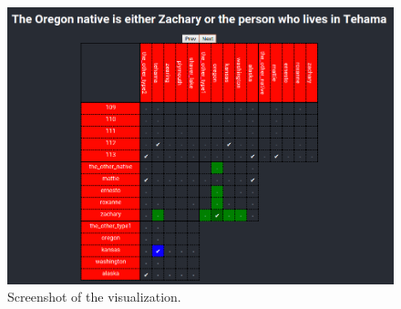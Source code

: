 \begin{figure}
 \includegraphics[width=\columnwidth]{fig/screenshot.png}
 \caption{Screenshot of the visualization.}
 \label{fig:screenshot}
\end{figure}





% 
